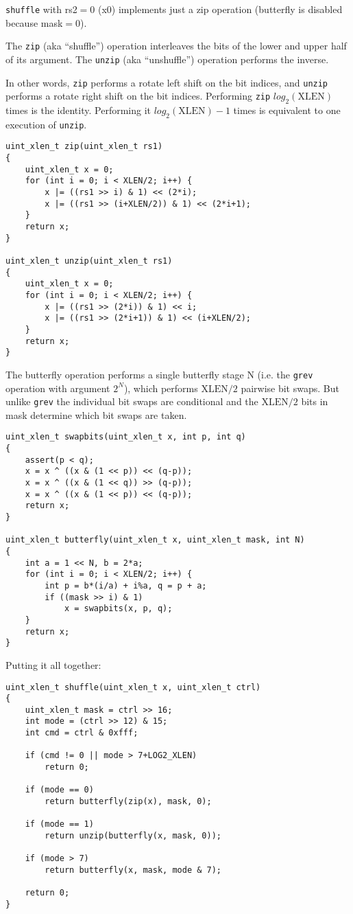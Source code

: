\texttt{shuffle} with rs2$=$0 (x0) implements just a zip operation (butterfly is
disabled because mask$=$0).

The \texttt{zip} (aka ``shuffle'') operation interleaves the bits of the lower and upper
half of its argument. The \texttt{unzip} (aka ``unshuffle'') operation performs the inverse.

In other words, \texttt{zip} performs a rotate left shift on the bit indices,
and \texttt{unzip} performs a rotate right shift on the bit indices.
Performing \texttt{zip} $log_2(\textrm{XLEN})$ times is the identity. Performing it
$log_2(\textrm{XLEN})-1$ times is equivalent to one execution of \texttt{unzip}.

\begin{verbatim}
uint_xlen_t zip(uint_xlen_t rs1)
{
    uint_xlen_t x = 0;
    for (int i = 0; i < XLEN/2; i++) {
        x |= ((rs1 >> i) & 1) << (2*i);
        x |= ((rs1 >> (i+XLEN/2)) & 1) << (2*i+1);
    }
    return x;
}

uint_xlen_t unzip(uint_xlen_t rs1)
{
    uint_xlen_t x = 0;
    for (int i = 0; i < XLEN/2; i++) {
        x |= ((rs1 >> (2*i)) & 1) << i;
        x |= ((rs1 >> (2*i+1)) & 1) << (i+XLEN/2);
    }
    return x;
}
\end{verbatim}

The butterfly operation performs a single butterfly stage N (i.e. the {\tt grev} operation
with argument $2^N$), which performs $\textrm{XLEN}/2$ pairwise bit swaps. But unlike
{\tt grev} the individual bit swaps are conditional and the $\textrm{XLEN}/2$
bits in mask determine which bit swaps are taken.

\begin{verbatim}
uint_xlen_t swapbits(uint_xlen_t x, int p, int q)
{
    assert(p < q);
    x = x ^ ((x & (1 << p)) << (q-p));
    x = x ^ ((x & (1 << q)) >> (q-p));
    x = x ^ ((x & (1 << p)) << (q-p));
    return x;
}

uint_xlen_t butterfly(uint_xlen_t x, uint_xlen_t mask, int N)
{
    int a = 1 << N, b = 2*a;
    for (int i = 0; i < XLEN/2; i++) {
        int p = b*(i/a) + i%a, q = p + a;
        if ((mask >> i) & 1)
            x = swapbits(x, p, q);
    }
    return x;
}
\end{verbatim}

Putting it all together:

\begin{verbatim}
uint_xlen_t shuffle(uint_xlen_t x, uint_xlen_t ctrl)
{
    uint_xlen_t mask = ctrl >> 16;
    int mode = (ctrl >> 12) & 15;
    int cmd = ctrl & 0xfff;

    if (cmd != 0 || mode > 7+LOG2_XLEN)
        return 0;

    if (mode == 0)
        return butterfly(zip(x), mask, 0);

    if (mode == 1)
        return unzip(butterfly(x, mask, 0));

    if (mode > 7)
        return butterfly(x, mask, mode & 7);

    return 0;
}
\end{verbatim}

